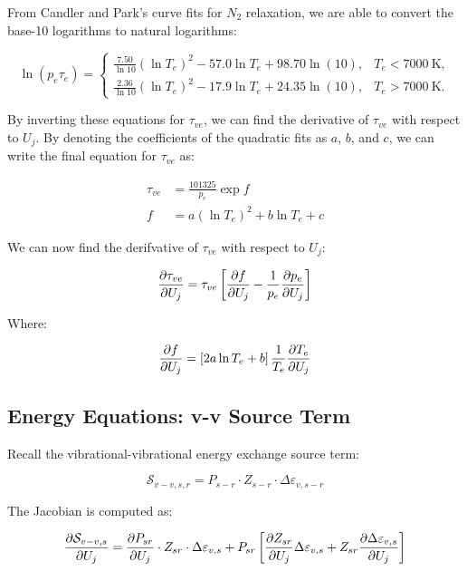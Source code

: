 \documentclass[10pt]{article}
\begin{document}
\begin{flushleft}
From Candler and Park's curve fits for $N_2$ relaxation, we are able to convert the base-10 logarithms to natural logarithms:

\begin{equation}
\ln\!\left(p_e \tau_e\right)=
\begin{cases}
\frac{7.50}{\ln 10} (\ln T_e)^2 - 57.0 \ln T_e + 98.70 \ln(10),
& T_e < 7000~\si{\kelvin}, \\[0.5em]
\frac{2.36}{\ln 10} (\ln T_e)^2 - 17.9 \ln T_e + 24.35 \ln(10),
& T_e > 7000~\si{\kelvin}.
\end{cases}
\end{equation}

By inverting these equations for $\tau_{ve}$, we can find the derivative of $\tau_{ve}$ with respect to $U_j$. By denoting the coefficients of the quadratic fits as $a$, $b$, and $c$, we can write the final equation for $\tau_{ve}$ as:

\begin{align}
    \tau_{ve} &= \frac{101325}{p_e} \exp{f} \\
    f &= a (\ln T_e)^2 + b \ln T_e + c
\end{align}

We can now find the derifvative of $\tau_{ve}$ with respect to $U_j$:

\begin{equation}
    \frac{\partial \tau_{ve}}{\partial U_j} = \tau_{ve} \left[ \frac{\partial f}{\partial U_j} - \frac{1}{p_e} \frac{\partial p_e}{\partial U_j} \right]
\end{equation}

Where:

\begin{equation}
    \frac{\partial f}{\partial U_j} = \left[ 2 a \ln T_e + b \right] \frac{1}{T_e} \frac{\partial T_e}{\partial U_j}
\end{equation}


\subsection{Energy Equations: v-v Source Term}

Recall the vibrational-vibrational energy exchange source term:

\begin{equation*}
    \mathcal{S}_{v-v,s,r} = P_{s-r} \cdot Z_{s-r} \cdot \Delta \varepsilon_{v,s-r}
\end{equation*}

The Jacobian is computed as:

\begin{equation}
    \frac{\partial \mathcal{S}_{v-v,s}}{\partial U_j} = \frac{\partial P_{sr}}{\partial U_j} \cdot Z_{sr} \cdot \Delta \varepsilon_{v,s} + P_{sr} \left[ \frac{\partial Z_{sr}}{\partial U_j} \Delta \varepsilon_{v,s} + Z_{sr} \frac{\partial \Delta \varepsilon_{v,s}}{\partial U_j}  \right]
\end{equation}


\end{flushleft}
\end{document}
